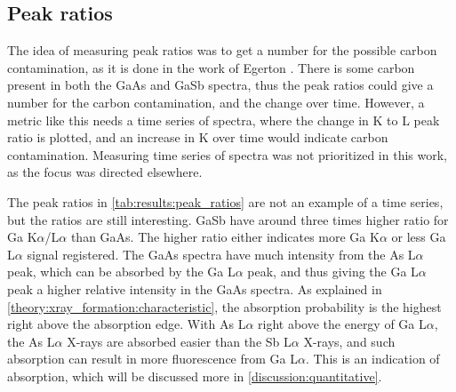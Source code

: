 \subsection{Peak ratios}
\label{discussion:peak_ratios}

The idea of measuring peak ratios was to get a number for the possible carbon contamination, as it is done in the work of Egerton \cite{egerton_nio_characterization_1994}.
There is some carbon present in both the GaAs and GaSb spectra, thus the peak ratios could give a number for the carbon contamination, and the change over time.
However, a metric like this needs a time series of spectra, where the change in K to L peak ratio is plotted, and an increase in K over time would indicate carbon contamination.
Measuring time series of spectra was not prioritized in this work, as the focus was directed elsewhere.

The peak ratios in \cref{tab:results:peak_ratios} are not an example of a time series, but the ratios are still interesting.
GaSb have around three times higher ratio for Ga K$\alpha$/L$\alpha$ than GaAs.
The higher ratio either indicates more Ga K$\alpha$ or less Ga L$\alpha$ signal registered.
The GaAs spectra have much intensity from the As L$\alpha$ peak, which can be absorbed by the Ga L$\alpha$ peak, and thus giving the Ga L$\alpha$ peak a higher relative intensity in the GaAs spectra.
As explained in \cref{theory:xray_formation:characteristic}, the absorption probability is the highest right above the absorption edge.
With As L$\alpha$ right above the energy of Ga L$\alpha$, the As L$\alpha$ X-rays are absorbed easier than the Sb L$\alpha$ X-rays, and such absorption can result in more fluorescence from Ga L$\alpha$.
This is an indication of absorption, which will be discussed more in \cref{discussion:quantitative}.



